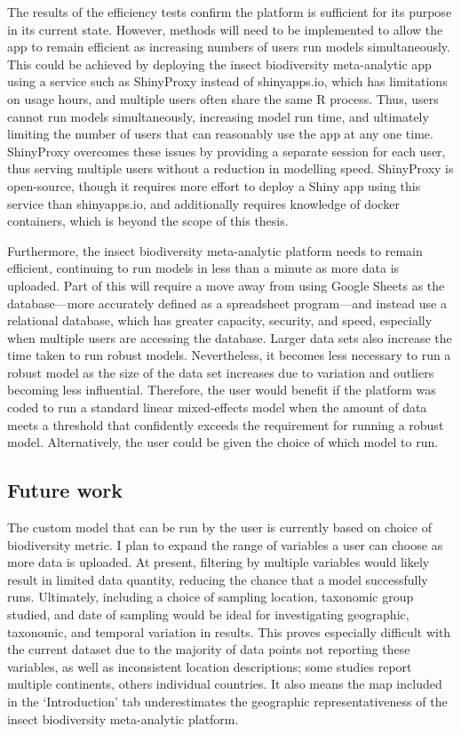 \documentclass[11pt]{article}
\begin{document}
		\noindent The results of the efficiency tests confirm the platform is sufficient for its purpose in its current state. However, methods will need to be implemented to allow the app to remain efficient as increasing numbers of users run models simultaneously. This could be achieved by deploying the insect biodiversity meta-analytic app using a service such as ShinyProxy \citep{open2022shiny} instead of shinyapps.io, which has limitations on usage hours, and multiple users often share the same R process. Thus, users cannot run models simultaneously, increasing model run time, and ultimately limiting the number of users that can reasonably use the app at any one time. ShinyProxy overcomes these issues by providing a separate session for each user, thus serving multiple users without a reduction in modelling speed. ShinyProxy is open-source, though it requires more effort to deploy a Shiny app using this service than shinyapps.io, and additionally requires knowledge of docker containers, which is beyond the scope of this thesis.
		
		\noindent Furthermore, the insect biodiversity meta-analytic platform needs to remain efficient, continuing to run models in less than a minute as more data is uploaded. Part of this will require a move away from using Google Sheets as the database—more accurately defined as a spreadsheet program—and instead use a relational database, which has greater capacity, security, and speed, especially when multiple users are accessing the database. Larger data sets also increase the time taken to run robust models. Nevertheless, it becomes less necessary to run a robust model as the size of the data set increases due to variation and outliers becoming less influential. Therefore, the user would benefit if the platform was coded to run a standard linear mixed-effects model when the amount of data meets a threshold that confidently exceeds the requirement for running a robust model. Alternatively, the user could be given the choice of which model to run.  
		
		\subsection{Future work}
		The custom model that can be run by the user is currently based on choice of biodiversity metric. I plan to expand the range of variables a user can choose as more data is uploaded. At present, filtering by multiple variables would likely result in limited data quantity, reducing the chance that a model successfully runs. Ultimately, including a choice of sampling location, taxonomic group studied, and date of sampling would be ideal for investigating geographic, taxonomic, and temporal variation in results. This proves especially difficult with the current dataset due to the majority of data points not reporting these variables, as well as inconsistent location descriptions; some studies report multiple continents, others individual countries. It also means the map included in the ‘Introduction’ tab underestimates the geographic representativeness of the insect biodiversity meta-analytic platform. 
		
\end{document}
